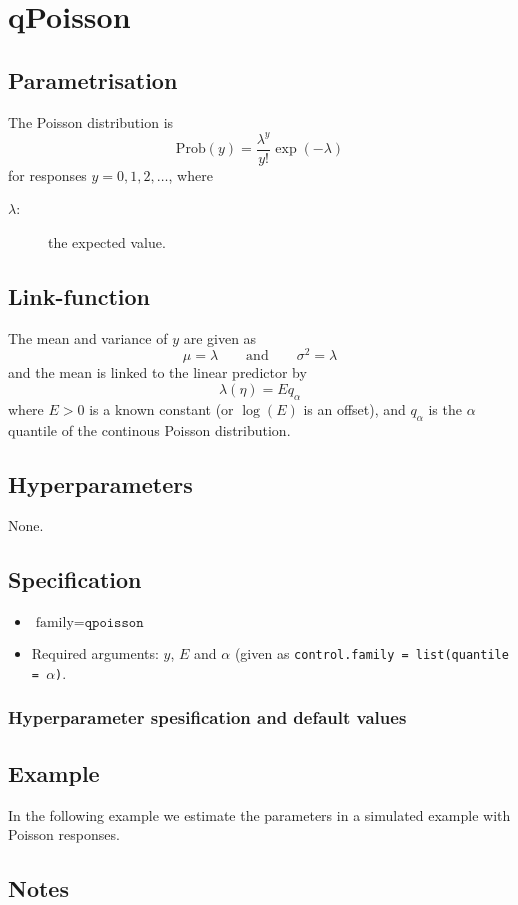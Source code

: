 \documentclass[a4paper,11pt]{article}
\begin{document}
\section*{qPoisson}

\subsection*{Parametrisation}

The Poisson distribution is
\begin{displaymath}
    \text{Prob}(y) = \frac{\lambda^{y}}{y!}\exp(-\lambda)
\end{displaymath}
for responses $y=0, 1, 2, \ldots$, where
\begin{description}
\item[$\lambda$:] the expected value.
\end{description}

\subsection*{Link-function}

The mean and variance of $y$ are given as
\begin{displaymath}
    \mu = \lambda \qquad\text{and}\qquad \sigma^{2} = \lambda
\end{displaymath}
and the mean is linked to the linear predictor by
\begin{displaymath}
    \lambda(\eta) = E q_\alpha
\end{displaymath}
where $E>0$ is a known constant (or $\log(E)$ is an offset), and
$q_\alpha$ is the $\alpha$ quantile of the continous Poisson
distribution.

\subsection*{Hyperparameters}
None.


\subsection*{Specification}

\begin{itemize}
\item $\text{family}=\texttt{qpoisson}$
\item Required arguments: $y$, $E$ and $\alpha$ (given as
    \texttt{control.family = list(quantile = $\alpha$)}.
\end{itemize}

\subsubsection*{Hyperparameter spesification and default values}


\subsection*{Example}

In the following example we estimate the parameters in a simulated
example with Poisson responses.


\subsection*{Notes}
\end{document}
